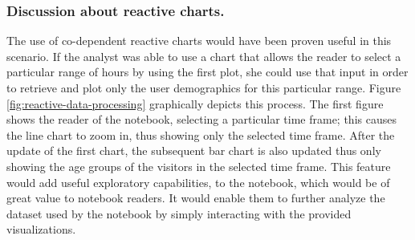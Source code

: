 \subsubsection*{Discussion about reactive charts.} The use of co-dependent reactive charts would have been proven useful in this scenario. If the analyst was able to use a chart that allows the reader to select a particular range of hours by using the first plot, she could use that input in order to retrieve and plot only the user demographics for this particular range. Figure \ref{fig:reactive-data-processing} graphically depicts this process. The first figure shows the reader of the notebook, selecting a particular time frame; this causes the line chart to zoom in, thus showing only the selected time frame. After the update of the first chart, the subsequent bar chart is also updated thus only showing the age groups of the visitors in the selected time frame. This feature would add useful exploratory capabilities, to the notebook, which would be of great value to notebook readers. It would enable them to further analyze the dataset used by the notebook by simply interacting with the provided visualizations. 

